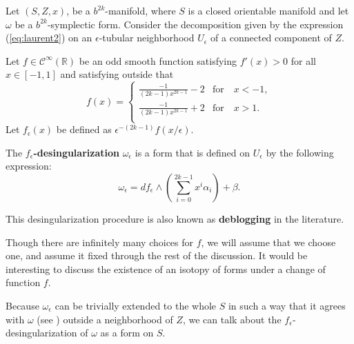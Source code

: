 \begin{definition}\label{dfn:deblogging} {Let $(S,Z,x)$, be a $b^{2k}$-manifold, where $S$ is a closed orientable manifold and let $\omega$ be a $b^{2k}$-symplectic form. Consider  the decomposition given by the expression (\ref{eq:laurent2}) on an $\epsilon$-tubular neighborhood $U_\epsilon$ of a connected component of $Z$.}


	Let $f \in \mathcal{C}^\infty(\mathbb{R})$ be an odd smooth function satisfying $f'(x) > 0$ for all $x \in \left[-1,1\right] $ and satisfying outside that
\begin{equation}
f(x) = \begin{cases}
\frac{-1}{(2k-1)x^{2k-1}}-2& \text{for} \quad x < -1,\\
\frac{-1}{(2k-1)x^{2k-1}}+2& \text{for} \quad x > 1.\\
\end{cases}
\end{equation}
	Let $f_\epsilon(x)$ be defined as $\epsilon^{-(2k -1)}f(x/\epsilon)$.



The \textbf{$f_\epsilon$-desingularization} $\omega_\epsilon$ is {a form that is defined on $U_\epsilon$ by the following expression:}
	$$\omega_\epsilon = df_\epsilon \wedge \left(\sum_{i=0}^{2k-1}x^i\alpha_i\right) + \beta.
	$$
\end{definition}

{This desingularization procedure is also known as \textbf{deblogging} in the literature.}

{
\begin{remark}
Though there are infinitely many choices for $f$, we will assume that we choose one, and assume it fixed through the rest of the discussion. It would be interesting to discuss the existence of an  isotopy of forms under a change of function $f$.
\end{remark}
}

{
\begin{remark}
Because $\omega_\epsilon$ can be trivially extended  to the whole $S$ in such a way that it agrees with $\omega$ (see  \cite{GMW17}) outside a neighborhood of $Z$, we can  talk about the $f_\epsilon$-desingularization of $\omega$  as a form on $S$.
\end{remark}
}

